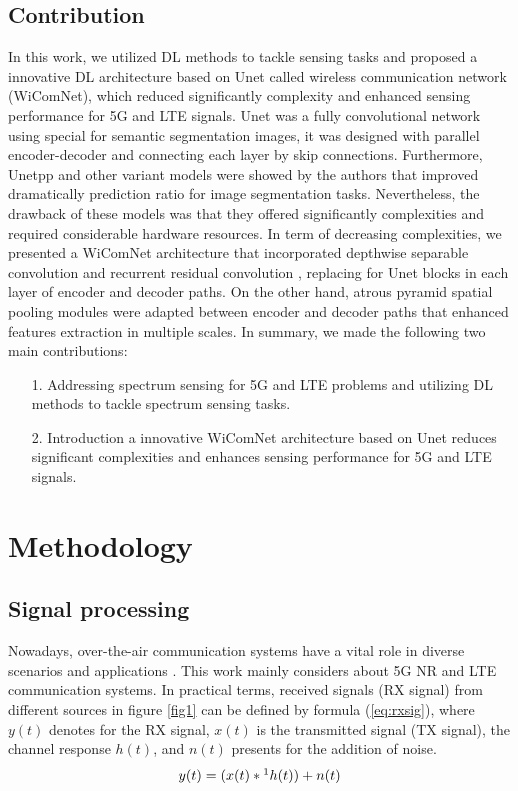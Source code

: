 \documentclass[journal]{IEEEtran} %
\begin{document}
\subsection{Contribution}
In this work, we utilized DL methods to tackle sensing tasks and proposed a innovative DL architecture based on Unet called wireless communication network (WiComNet), which reduced significantly complexity and enhanced sensing performance for 5G and LTE signals. Unet was a fully convolutional network \cite{ronneberger2015u} using special for semantic segmentation images, it was designed with parallel encoder-decoder and connecting each layer by skip connections. Furthermore, Unetpp and other variant models were showed by the authors \cite{zhou2019unet++} that improved dramatically prediction ratio for image segmentation tasks. Nevertheless, the drawback of these models was that they offered significantly complexities and required considerable hardware resources. In term of decreasing complexities, we presented a WiComNet architecture that incorporated depthwise separable convolution \cite{CholletXception} and recurrent residual convolution \cite{AlomNuclei} \cite{he2016deep} \cite{aghalari2021brain}, replacing for Unet blocks in each layer of encoder and decoder paths. On the other hand, atrous pyramid spatial pooling modules \cite{ChenAtrous} were adapted between encoder and decoder paths that enhanced features extraction in multiple scales. In summary, we made the following two main contributions:
\begin{itemize}
\item[1.] Addressing spectrum sensing for 5G and LTE problems and utilizing DL methods to tackle spectrum sensing tasks.
\item[2.] Introduction a innovative WiComNet architecture based on Unet reduces significant complexities and enhances sensing performance for 5G and LTE signals.
\end{itemize}



\section{Methodology}


\subsection{Signal processing}
Nowadays, over-the-air communication systems have a vital role in diverse scenarios and applications \cite{lin20215g}. This work mainly considers about 5G NR and LTE communication systems. In practical terms, received signals (RX signal) from different sources in figure \ref{fig1} can be defined by formula (\ref{eq:rxsig}), where \( y(t) \) denotes for the RX signal, \( x(t) \) is the transmitted signal (TX signal), the channel response \(h(t)\), and \(n(t)\) presents for the addition of noise. 
\begin{equation}
    y(t) = (x(t) *\footnote{\label{Convop}*: representation for convolution operation} h(t)) + n(t)
    \label{eq:rxsig}
\end{equation}
\end{document}
